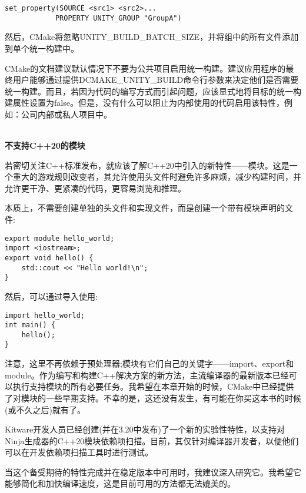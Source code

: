 \begin{lstlisting}[style=styleCMake]
set_property(SOURCE <src1> <src2>...
			PROPERTY UNITY_GROUP "GroupA")
\end{lstlisting}

然后，CMake将忽略UNITY\_BUILD\_BATCH\_SIZE，并将组中的所有文件添加到单个统一构建中。

CMake的文档建议默认情况下不要为公共项目启用统一构建。建议应用程序的最终用户能够通过提供DCMAKE\_UNITY\_BUILD命令行参数来决定他们是否需要统一构建。而且，若因为代码的编写方式而引起问题，应该显式地将目标的统一构建属性设置为false。但是，没有什么可以阻止为内部使用的代码启用该特性，例如：公司内部或私人项目中。

\hspace*{\fill} \\ %
\noindent
\textbf{不支持C++20的模块}

若密切关注C++标准发布，就应该了解C++20中引入的新特性——模块。这是一个重大的游戏规则改变者，其允许使用头文件时避免许多麻烦，减少构建时间，并允许更干净、更紧凑的代码，更容易浏览和推理。

本质上，不需要创建单独的头文件和实现文件，而是创建一个带有模块声明的文件:

\begin{lstlisting}[style=styleCXX]
export module hello_world;
import <iostream>;
export void hello() {
	std::cout << "Hello world!\n";
}
\end{lstlisting}

然后，可以通过导入使用:

\begin{lstlisting}[style=styleCXX]
import hello_world;
int main() {
	hello();
}
\end{lstlisting}

注意，这里不再依赖于预处理器;模块有它们自己的关键字——import、export和module。作为编写和构建C++解决方案的新方法，主流编译器的最新版本已经可以执行支持模块的所有必要任务。我希望在本章开始的时候，CMake中已经提供了对模块的一些早期支持。不幸的是，这还没有发生，有可能在你买这本书的时候(或不久之后)就有了。

Kitware开发人员已经创建(并在3.20中发布)了一个新的实验性特性，以支持对Ninja生成器的C++20模块依赖项扫描。目前，其仅针对编译器开发者，以便他们可以在开发依赖项扫描工具时进行测试。

当这个备受期待的特性完成并在稳定版本中可用时，我建议深入研究它。我希望它能够简化和加快编译速度，这是目前可用的方法都无法媲美的。


